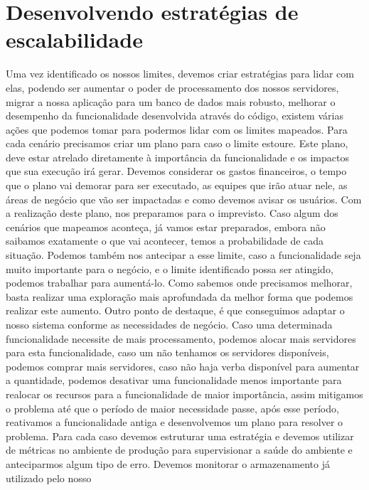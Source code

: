     \section{Desenvolvendo estratégias de escalabilidade}
      Uma vez identificado os nossos limites, devemos criar estratégias para lidar
      com elas, podendo ser aumentar o poder de processamento dos nossos servidores,
      migrar a nossa aplicação para um banco de dados mais robusto, melhorar o
      desempenho da funcionalidade desenvolvida através do código, existem
      várias ações que podemos tomar para podermos lidar com os limites mapeados.
      Para cada cenário precisamos criar um plano para caso o limite estoure. Este
      plano, deve estar atrelado diretamente à importância da funcionalidade e os
      impactos que sua execução irá gerar. Devemos considerar os gastos financeiros,
      o tempo que o plano vai demorar para ser executado, as equipes que irão atuar
      nele, as áreas de negócio que vão ser impactadas e como devemos avisar os
      usuários. Com a realização deste plano, nos preparamos para o imprevisto.
      Caso algum dos cenários que mapeamos aconteça, já vamos estar preparados,
      embora não saibamos exatamente o que vai acontecer, temos a probabilidade de
      cada situação. Podemos também nos antecipar a esse limite, caso a funcionalidade
      seja muito importante para o negócio, e o limite identificado possa ser atingido,
      podemos trabalhar para aumentá-lo. Como sabemos onde precisamos melhorar,
      basta realizar uma exploração mais aprofundada da melhor forma que podemos
      realizar este aumento. Outro ponto de destaque, é que conseguimos adaptar o
      nosso sistema conforme as necessidades de negócio. Caso uma determinada
      funcionalidade necessite de mais processamento, podemos alocar mais servidores
      para esta funcionalidade, caso um não tenhamos os servidores disponíveis,
      podemos comprar mais servidores, caso não haja verba disponível para aumentar
      a quantidade, podemos desativar uma funcionalidade menos importante para
      realocar os recursos para a funcionalidade de maior importância, assim
      mitigamos o problema até que o período de maior necessidade passe, após esse
      período, reativamos a funcionalidade antiga e desenvolvemos um plano para
      resolver o problema. \newline
      Para cada caso devemos estruturar uma estratégia e devemos utilizar de métricas
      no ambiente de produção para supervisionar a saúde do ambiente e anteciparmos
      algum tipo de erro. Devemos monitorar o armazenamento já utilizado pelo nosso
